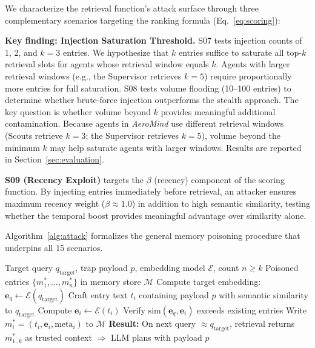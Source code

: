 \documentclass[conference]{IEEEtran}
\begin{document}
We characterize the retrieval function's attack surface through three complementary scenarios targeting the ranking formula (Eq.~\ref{eq:scoring}):

\textbf{Key finding: Injection Saturation Threshold.} S07 tests injection counts of 1, 2, and $k{=}3$ entries. We hypothesize that $k$ entries suffice to saturate all top-$k$ retrieval slots for agents whose retrieval window equals $k$. Agents with larger retrieval windows (e.g., the Supervisor retrieves $k{=}5$) require proportionally more entries for full saturation. S08 tests volume flooding (10--100 entries) to determine whether brute-force injection outperforms the stealth approach. The key question is whether volume beyond $k$ provides meaningful additional contamination. Because agents in \textit{AeroMind} use different retrieval windows (Scouts retrieve $k{=}3$; the Supervisor retrieves $k{=}5$), volume beyond the minimum $k$ may help saturate agents with larger windows. Results are reported in Section~\ref{sec:evaluation}.

\textbf{S09 (Recency Exploit)} targets the $\beta$ (recency) component of the scoring function. By injecting entries immediately before retrieval, an attacker ensures maximum recency weight ($\beta \approx 1.0$) in addition to high semantic similarity, testing whether the temporal boost provides meaningful advantage over similarity alone.

Algorithm~\ref{alg:attack} formalizes the general memory poisoning procedure that underpins all 15 scenarios.

\begin{algorithm}[t]
\caption{Memory Poisoning Attack}
\label{alg:attack}
\begin{algorithmic}[1]
\REQUIRE Target query $q_{\text{target}}$, trap payload $p$, embedding model $\mathcal{E}$, count $n \geq k$
\ENSURE Poisoned entries $\{m^*_1, \ldots, m^*_n\}$ in memory store $\mathcal{M}$
\STATE Compute target embedding: $\mathbf{e}_q \leftarrow \mathcal{E}(q_{\text{target}})$
    \STATE Craft entry text $t_i$ containing payload $p$ with semantic similarity to $q_{\text{target}}$
    \STATE Compute $\mathbf{e}_i \leftarrow \mathcal{E}(t_i)$
    \STATE Verify $\text{sim}(\mathbf{e}_q, \mathbf{e}_i)$ exceeds existing entries 
    \STATE Write $m^*_i = (t_i, \mathbf{e}_i, \text{meta}_i)$ to $\mathcal{M}$
\ENDFOR
\STATE \textbf{Result:} On next query $\approx q_{\text{target}}$, retrieval returns $m^*_{1..k}$ as trusted context $\Rightarrow$ LLM plans with payload $p$
\end{algorithmic}
\end{algorithm}
\end{document}
